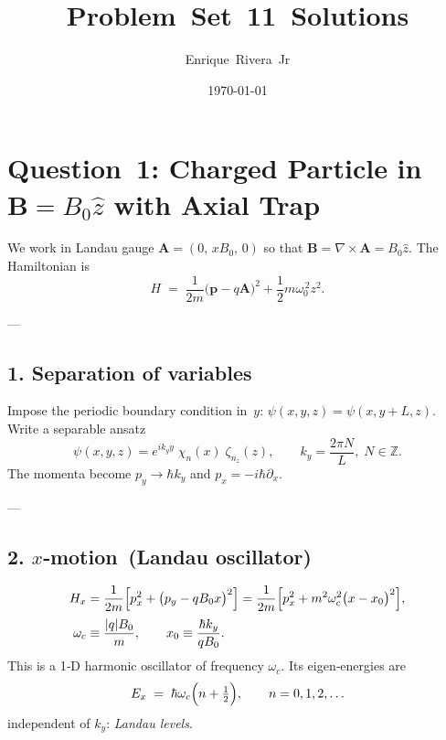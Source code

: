 \documentclass[12pt]{article}
\begin{document}
\title{Problem Set 11 Solutions}
\author{Enrique Rivera Jr}
\date{\today}

\maketitle

\section*{Question 1: Charged Particle in \(\mathbf B=B_0\hat z\) with Axial Trap}
We work in Landau gauge
\(\mathbf A=(0,\,xB_0,\,0)\) so that
\(\mathbf B=\nabla\times\mathbf A=B_0\hat z\).  The Hamiltonian is
\begin{equation}
 H\;=\;\frac{1}{2m}\bigl(\mathbf p-q\mathbf A\bigr)^2 
            +\frac12 m\omega_0^{\,2}z^2.
\end{equation}

---
\subsection*{1. Separation of variables}
Impose the periodic boundary condition in~$y$:
\(\psi(x,y,z)=\psi(x,y+L,z)\).  Write a separable ansatz
\begin{equation}
 \psi(x,y,z)=e^{ik_y y}\;\chi_n(x)\;\zeta_{n_z}(z),
 \qquad k_y=\frac{2\pi N}{L},\;N\in\mathbb Z.
\end{equation}
The momenta become
\(p_y\to\hbar k_y\) and \(p_x=-i\hbar\partial_x\).

---
\subsection*{2.  $x$‐motion \,(Landau oscillator)}
\begin{align}
 H_x &=\frac1{2m}\Bigl[p_x^2+\bigl(p_y-qB_0x\bigr)^2\Bigr]
     =\frac1{2m}\Bigl[p_x^2+m^2\omega_c^{2}\bigl(x-x_0\bigr)^2\Bigr],\\[2pt]
 \omega_c &\equiv \frac{|q|B_0}{m}, \qquad x_0\equiv \frac{\hbar k_y}{qB_0}.
\end{align}
This is a 1‑D harmonic oscillator of frequency \(\omega_c\).  Its eigen‑energies are
\begin{equation}
 E_x\;=\;\hbar\omega_c\Bigl(n+\tfrac12\Bigr),\qquad n=0,1,2,\dots
\label{landau}
\end{equation}
independent of \(k_y\): \emph{Landau levels}.
\end{document}
